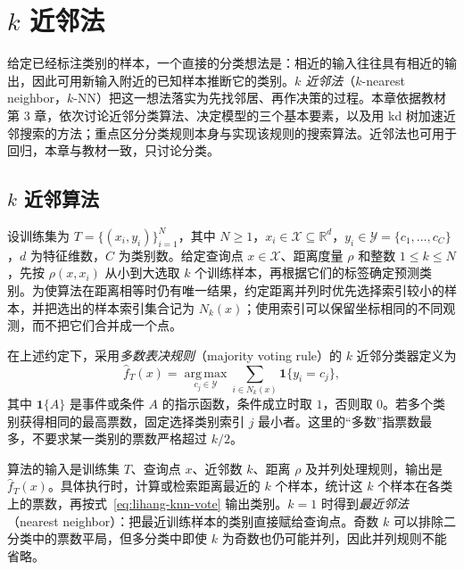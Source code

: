 \setcounter{chapter}{2} %
\chapter{$k$ 近邻法}
\label{chap:lihang-knn}

给定已经标注类别的样本，一个直接的分类想法是：相近的输入往往具有相近的输出，因此可用新输入附近的已知样本推断它的类别。\emph{$k$ 近邻法}（$k$-nearest neighbor，$k$-NN）把这一想法落实为先找邻居、再作决策的过程。本章依据教材第 3 章，依次讨论近邻分类算法、决定模型的三个基本要素，以及用 kd 树加速近邻搜索的方法；重点区分分类规则本身与实现该规则的搜索算法。近邻法也可用于回归，本章与教材一致，只讨论分类。

\section{$k$ 近邻算法}
\label{sec:lihang-knn-algorithm}

设训练集为 $T=\{(x_i,y_i)\}_{i=1}^{N}$，其中 $N\geq1$，$x_i\in\mathcal X\subseteq\mathbb R^d$，$y_i\in\mathcal Y=\{c_1,\ldots,c_C\}$，$d$ 为特征维数，$C$ 为类别数。给定查询点 $x\in\mathcal X$、距离度量 $\rho$ 和整数 $1\leq k\leq N$，先按 $\rho(x,x_i)$ 从小到大选取 $k$ 个训练样本，再根据它们的标签确定预测类别。为使算法在距离相等时仍有唯一结果，约定距离并列时优先选择索引较小的样本，并把选出的样本索引集合记为 $N_k(x)$；使用索引可以保留坐标相同的不同观测，而不把它们合并成一个点。

\begin{definition}
\label{def:lihang-knn-rule}
在上述约定下，采用\emph{多数表决规则}（majority voting rule）的 $k$ 近邻分类器定义为
\begin{equation}
  \widehat f_T(x)
  =\underset{c_j\in\mathcal Y}{\operatorname{arg\,max}}
    \sum_{i\in N_k(x)}\mathbf 1\{y_i=c_j\},
  \label{eq:lihang-knn-vote}
\end{equation}
其中 $\mathbf 1\{A\}$ 是事件或条件 $A$ 的指示函数，条件成立时取 $1$，否则取 $0$。若多个类别获得相同的最高票数，固定选择类别索引 $j$ 最小者。这里的“多数”指票数最多，不要求某一类别的票数严格超过 $k/2$。
\end{definition}

算法的输入是训练集 $T$、查询点 $x$、近邻数 $k$、距离 $\rho$ 及并列处理规则，输出是 $\widehat f_T(x)$。具体执行时，计算或检索距离最近的 $k$ 个样本，统计这 $k$ 个样本在各类上的票数，再按式~\eqref{eq:lihang-knn-vote} 输出类别。$k=1$ 时得到\emph{最近邻法}（nearest neighbor）：把最近训练样本的类别直接赋给查询点。奇数 $k$ 可以排除二分类中的票数平局，但多分类中即使 $k$ 为奇数也仍可能并列，因此并列规则不能省略。

